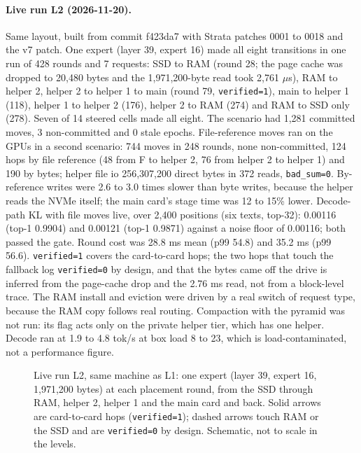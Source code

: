 \documentclass[11pt]{article}
\begin{document}
\paragraph{Live run L2 (2026-11-20).} Same layout, built from commit f423da7 with Strata patches 0001 to 0018 and the v7 patch.
One expert (layer 39, expert 16) made all eight transitions in one run of 428 rounds and 7 requests: SSD to RAM (round 28; the page
cache was dropped to 20,480 bytes and the 1,971,200-byte read took 2,761 $\mu$s), RAM to helper 2, helper 2 to helper 1 to main
(round 79, \texttt{verified=1}), main to helper 1 (118), helper 1 to helper 2 (176), helper 2 to RAM (274) and RAM to SSD only
(278). Seven of 14 steered cells made all eight. The scenario had 1,281 committed moves, 3 non-committed and 0 stale epochs.
File-reference moves ran on the GPUs in a second scenario: 744 moves in 248 rounds, none non-committed, 124 hops by file reference
(48 from F to helper 2, 76 from helper 2 to helper 1) and 190 by bytes; helper file io 256,307,200 direct bytes in 372 reads,
\texttt{bad\_sum=0}. By-reference writes were 2.6 to 3.0 times slower than byte writes, because the helper reads the NVMe itself;
the main card's stage time was 12 to 15\% lower. Decode-path KL with file moves live, over 2,400 positions (six texts, top-32): 0.00116
(top-1 0.9904) and 0.00121 (top-1 0.9871) against a noise floor of 0.00116; both passed the gate. Round cost was 28.8 ms mean
(p99 54.8) and 35.2 ms (p99 56.6). \texttt{verified=1} covers the card-to-card hops; the two hops that touch the fallback log
\texttt{verified=0} by design, and that the bytes came off the drive is inferred from the page-cache drop and the 2.76 ms read, not
from a block-level trace. The RAM install and eviction were driven by a real switch of request type, because the RAM copy follows
real routing. Compaction with the pyramid was not run: its flag acts only on the private helper tier, which has one helper. Decode
ran at 1.9 to 4.8 tok/s at box load 8 to 23, which is load-contaminated, not a performance figure.

\begin{figure}[t]
\centering

\caption{Live run L2, same machine as L1: one expert (layer 39, expert 16, 1,971,200 bytes) at each placement round, from the SSD
through RAM, helper 2, helper 1 and the main card and back. Solid arrows are card-to-card hops (\texttt{verified=1}); dashed arrows
touch RAM or the SSD and are \texttt{verified=0} by design. Schematic, not to scale in the levels.}
\label{fig:l2-walk}
\end{figure}
\end{document}
